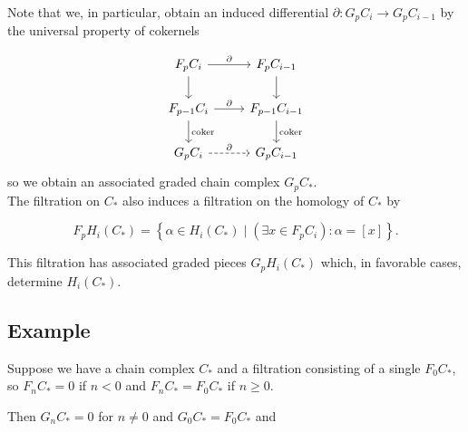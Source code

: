 \documentclass[reqno]{amsart}
\theoremstyle{definition}
\theoremstyle{remark}
\DeclareMathOperator{\coker}{coker}
\begin{document}
Note that we, in particular, obtain an
induced differential
$\partial \colon G_p C_i \to G_{p} C_{i-1}$ by
the universal property of cokernels

\begin{equation*}
\begin{tikzcd}
    F_p C_i \ar[d] \ar[r, "\partial"] & F_p C_{i-1} \ar[d] \\
    F_{p-1} C_i \ar[d, "\coker"]
    \ar[r, "\partial"] & F_{p-1} C_{i-1} \ar[d, "\coker"] \\
    G_p C_i \ar[r, "\partial", dashed] & G_p C_{i-1}
\end{tikzcd}
\end{equation*}
so we obtain an associated graded
chain complex $G_p C_*$.\\
\linebreak
The filtration on $C_*$ also induces
a filtration on the homology of $C_*$ by

\[
F_p H_i (C_*) = 
\left\{ \alpha \in 
H_i (C_*)  \mid 
\left( \exists x \in F_p C_i \right) \colon
\alpha = \left[ x \right] \right\} .
\] 

This filtration has associated graded pieces
$G_p H_i (C_*)$ which, in favorable cases, determine
$H_i (C_*)$.\\
\linebreak



\subsection{Example}

Suppose we have a chain complex
$C_*$ and a filtration consisting
of a single $F_0 C_*$, so
$F_n C_* = 0$ if
$n <0$ and
$F_n C_* = F_0 C_*$ if $n\ge 0$.

Then
$G_n C_* = 0$ for
$n \neq  0$ and
$G_0 C_* = F_0 C_*$ and



























\end{document}
